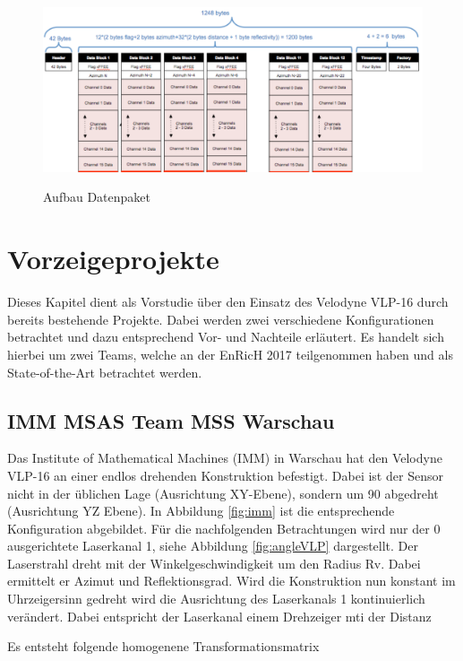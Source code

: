 \begin{figure}[H]
	\centering
	\includegraphics[width=1.0\textwidth]
	{resources/datapakets.PNG}
	\caption[Aufbau Datenpaket]{Aufbau Datenpaket} \protect\cite{velodyne}
	\label{fig:datapakets}
\end{figure}


\section{Vorzeigeprojekte}
 	\label{sec:Vorzeigeprojekte}
 Dieses Kapitel dient als Vorstudie über den Einsatz des Velodyne VLP-16 durch bereits bestehende Projekte. Dabei werden zwei verschiedene Konfigurationen betrachtet und dazu entsprechend Vor- und Nachteile erläutert. Es handelt sich hierbei um zwei Teams, welche an der \ac{EnRicH} 2017 teilgenommen haben und als State-of-the-Art betrachtet werden.
 
 
 \subsection{IMM MSAS Team MSS Warschau}
 	\label{subsec:IMM}
 Das Institute of Mathematical Machines (IMM) in Warschau hat den Velodyne VLP-16 an einer endlos drehenden Konstruktion befestigt. Dabei ist der Sensor nicht in der üblichen Lage (Ausrichtung XY-Ebene), sondern um 90 \degrees abgedreht (Ausrichtung YZ Ebene). In Abbildung \ref{fig:imm} ist die entsprechende Konfiguration abgebildet. 
Für die nachfolgenden Betrachtungen wird nur der 0 \degrees ausgerichtete Laserkanal 1, siehe Abbildung \ref{fig:angleVLP}  dargestellt. Der Laserstrahl dreht mit der Winkelgeschwindigkeit  um den Radius Rv. Dabei ermittelt er Azimut und Reflektionsgrad. Wird die Konstruktion nun konstant im Uhrzeigersinn gedreht wird die Ausrichtung des Laserkanals 1 kontinuierlich verändert. Dabei entspricht der Laserkanal einem Drehzeiger mti der Distanz

Es entsteht folgende homogenene Transformationsmatrix 

